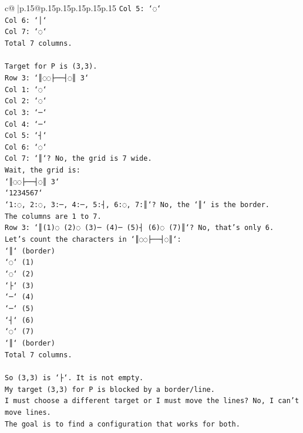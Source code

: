 \documentclass{article}
\begin{document}
{\begin{supertabular}{c@{$\;$}|p{.15\linewidth}@{}p{.15\linewidth}p{.15\linewidth}p{.15\linewidth}p{.15\linewidth}p{.15\linewidth}}
{{{\texttt{Col 5: `◌`} \\
\texttt{Col 6: `│`} \\
\texttt{Col 7: `◌`} \\
\texttt{Total 7 columns.} \\
\\ 
\texttt{Target for P is (3,3).} \\
\texttt{Row 3: `║◌◌├──┤◌║ 3`} \\
\texttt{Col 1: `◌`} \\
\texttt{Col 2: `◌`} \\
\texttt{Col 3: `─`} \\
\texttt{Col 4: `─`} \\
\texttt{Col 5: `┤`} \\
\texttt{Col 6: `◌`} \\
\texttt{Col 7: `║`? No, the grid is 7 wide.} \\
\texttt{Wait, the grid is:} \\
\texttt{`║◌◌├──┤◌║ 3`} \\
\texttt{`1234567`} \\
\texttt{`1:◌, 2:◌, 3:─, 4:─, 5:┤, 6:◌, 7:║`? No, the `║` is the border.} \\
\texttt{The columns are 1 to 7.} \\
\texttt{Row 3: `║(1)◌ (2)◌ (3)─ (4)─ (5)┤ (6)◌ (7)║`? No, that's only 6.} \\
\texttt{Let's count the characters in `║◌◌├──┤◌║`:} \\
\texttt{`║` (border)} \\
\texttt{`◌` (1)} \\
\texttt{`◌` (2)} \\
\texttt{`├` (3)} \\
\texttt{`─` (4)} \\
\texttt{`─` (5)} \\
\texttt{`┤` (6)} \\
\texttt{`◌` (7)} \\
\texttt{`║` (border)} \\
\texttt{Total 7 columns.} \\
\\ 
\texttt{So (3,3) is `├`. It is not empty.} \\
\texttt{My target (3,3) for P is blocked by a border/line.} \\
\texttt{I must choose a different target or I must move the lines? No, I can't move lines.} \\
\texttt{The goal is to find a configuration that works for both.} \\
}}}
\end{supertabular}}
\end{document}

